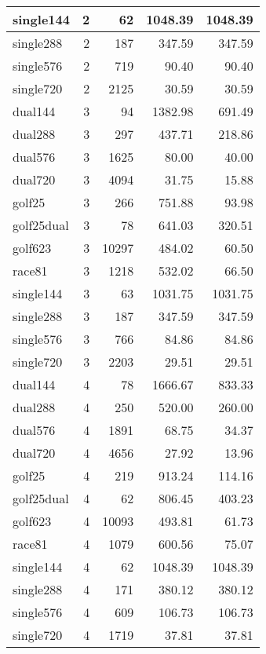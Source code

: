 \begin{longtable}[\textwidth]{lrrrr}
single144 & 2 & 62 & 1048.39 & 1048.39\\ \hline
single288 & 2 & 187 & 347.59 & 347.59\\ \hline
single576 & 2 & 719 & 90.40 & 90.40\\ \hline
single720 & 2 & 2125 & 30.59 & 30.59\\ \hline
dual144 & 3 & 94 & 1382.98 & 691.49\\ \hline
dual288 & 3 & 297 & 437.71 & 218.86\\ \hline
dual576 & 3 & 1625 & 80.00 & 40.00\\ \hline
dual720 & 3 & 4094 & 31.75 & 15.88\\ \hline
golf25 & 3 & 266 & 751.88 & 93.98\\ \hline
golf25dual & 3 & 78 & 641.03 & 320.51\\ \hline
golf623 & 3 & 10297 & 484.02 & 60.50\\ \hline
race81 & 3 & 1218 & 532.02 & 66.50\\ \hline
single144 & 3 & 63 & 1031.75 & 1031.75\\ \hline
single288 & 3 & 187 & 347.59 & 347.59\\ \hline
single576 & 3 & 766 & 84.86 & 84.86\\ \hline
single720 & 3 & 2203 & 29.51 & 29.51\\ \hline
dual144 & 4 & 78 & 1666.67 & 833.33\\ \hline
dual288 & 4 & 250 & 520.00 & 260.00\\ \hline
dual576 & 4 & 1891 & 68.75 & 34.37\\ \hline
dual720 & 4 & 4656 & 27.92 & 13.96\\ \hline
golf25 & 4 & 219 & 913.24 & 114.16\\ \hline
golf25dual & 4 & 62 & 806.45 & 403.23\\ \hline
golf623 & 4 & 10093 & 493.81 & 61.73\\ \hline
race81 & 4 & 1079 & 600.56 & 75.07\\ \hline
single144 & 4 & 62 & 1048.39 & 1048.39\\ \hline
single288 & 4 & 171 & 380.12 & 380.12\\ \hline
single576 & 4 & 609 & 106.73 & 106.73\\ \hline
single720 & 4 & 1719 & 37.81 & 37.81\\
\bottomrule[1.5pt]
\end{longtable}

